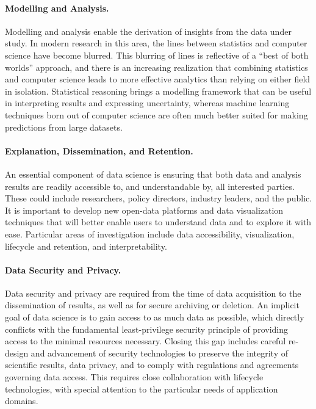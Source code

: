 \documentclass[11pt]{article}
\begin{document}
\paragraph{Modelling and Analysis.} Modelling and analysis enable the derivation of insights from the data under study. In modern research in this area, the lines between statistics and computer science have become blurred. This blurring of lines is reflective of a ``best of both worlds'' approach, and there is an increasing realization that combining statistics and computer science leads to more effective analytics than relying on either field in isolation. Statistical reasoning brings a modelling framework that can be useful in interpreting results and expressing uncertainty, whereas machine learning techniques born out of computer science are often much better suited for making predictions from large datasets.

\paragraph{Explanation, Dissemination, and Retention.} An essential component of data science is ensuring that both data and analysis results are readily accessible to, and understandable by, all interested parties. These could include researchers, policy directors, industry leaders, and the public. It is important to develop new open-data platforms and data visualization techniques that will better enable users to understand data and to explore it with ease. Particular areas of investigation include data accessibility, visualization, lifecycle and retention, and interpretability.

\paragraph{Data Security and Privacy.} Data security and privacy are required from the time of data acquisition to the dissemination of results, as well as for secure archiving or deletion. An implicit goal of data science is to gain access to as much data as possible, which directly conflicts with the fundamental least-privilege security principle of providing access to the minimal resources necessary. Closing this gap includes careful re-design and advancement of security technologies to preserve the integrity of scientific results, data privacy, and to comply with regulations and agreements governing data access. This requires close collaboration with lifecycle technologies, with special attention to the particular needs of application domains.
\end{document}
